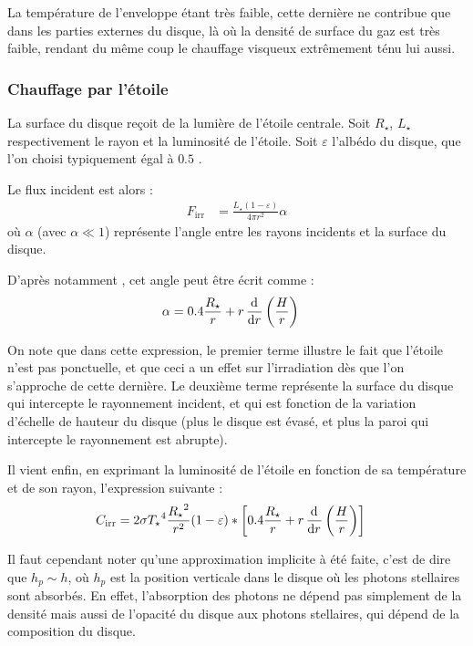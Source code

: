 La température de l'enveloppe étant très faible, cette dernière ne contribue que dans les parties externes du disque, là où la densité de surface du gaz est très faible, rendant du même coup le chauffage visqueux extrêmement ténu lui aussi.

\subsubsection{Chauffage par l'étoile}\label{sec:irradiation}
La surface du disque reçoit de la lumière de l'étoile centrale. Soit $R_\star$, $L_\star$ respectivement le rayon et la luminosité de l'étoile. Soit $\varepsilon$ l'albédo du disque, que l'on choisi typiquement égal à $0.5$  \citep{menou2004low}. 

Le flux incident est alors \citep[eq. (7)]{menou2004low} : 
\begin{align}
F_\text{irr} &= \frac{L_\star(1-\varepsilon)}{4\pi r^2} \alpha
\end{align}
où $\alpha$ (avec $\alpha\ll 1$) représente l'angle entre les rayons incidents et la surface du disque. 

D'après notamment \cite[eq. (5)]{chiang1997spectral}, cet angle peut être écrit comme : 
\begin{align}
\alpha &= 0.4 \frac{R_\star}{r} + r \mathinner{ \dfrac{\operatorname{d \!}{^{}}}{\operatorname{d \!}{{r}^{}}} }\left(\frac{H}{r}\right)
\end{align}

On note que dans cette expression, le premier terme illustre le fait que l'étoile n'est pas ponctuelle, et que ceci a un effet sur l'irradiation dès que l'on s'approche de cette dernière. Le deuxième terme représente la surface du disque qui intercepte le rayonnement incident, et qui est fonction de la variation d'échelle de hauteur du disque (plus le disque est évasé, et plus la paroi qui intercepte le rayonnement est abrupte). 

Il vient enfin, en exprimant la luminosité de l'étoile en fonction de sa température et de son rayon, l'expression suivante :
\begin{align}
C_\text{irr} &= 2 \sigma {T_\star}^4 \frac{{R_\star}^2}{r^2} (1-\varepsilon) * \left[0.4 \frac{R_\star}{r} + r \mathinner{ \dfrac{\operatorname{d \!}{^{}}}{\operatorname{d \!}{{r}^{}}} }\left(\frac{H}{r}\right)\right]
\end{align}

Il faut cependant noter qu'une approximation implicite à été faite, c'est de dire que $h_p\sim h$, où $h_p$ est la position verticale dans le disque où les photons stellaires sont absorbés. En effet, l'absorption des photons ne dépend pas simplement de la densité mais aussi de l'opacité du disque aux photons stellaires, qui dépend de la composition du disque.

